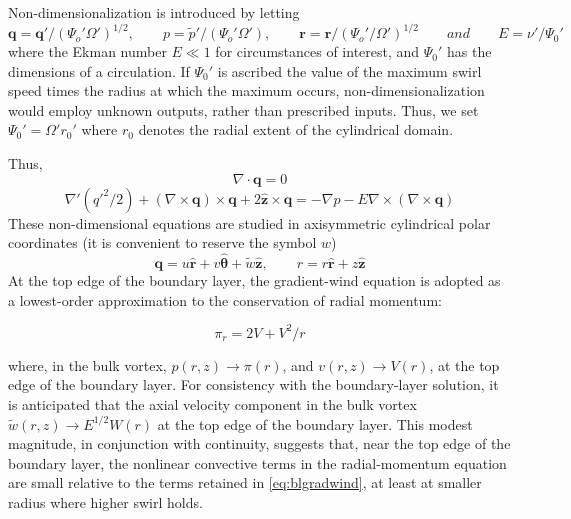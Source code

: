 \documentclass[preprint, prX]{revtex4}
\begin{document}
Non-dimensionalization is introduced by letting
\begin{equation}
\mathbf{q}=\mathbf{q'}/(\Psi_o' \Omega')^{1/2}, \qquad p=\tilde{p}' /(\Psi_o' \Omega'), \qquad \mathbf{r} = \mathbf{r}/(\Psi_o'/\Omega')^{1/2} \qquad and \qquad E = \nu' / \Psi_0'
\end{equation}
where the Ekman number $E \ll 1$ for circumstances of interest, and $\Psi_0'$ has the
dimensions of a circulation. If $\Psi_0'$ is ascribed the value of the maximum swirl speed times the radius at which the maximum occurs, non-dimensionalization would employ unknown outputs, rather than prescribed inputs. Thus, we set $\Psi_0' = \Omega' r_0'$ where $r_0$ denotes the radial extent of the cylindrical domain.

Thus,
\begin{equation}
\nabla \cdot \mathbf{q}=0
\label{eq:blcon}
\end{equation}
\begin{equation}
\nabla'(q'^2/2) +(\nabla \times \mathbf{q})\times \mathbf{q} + 2 \mathbf{\hat{z}} \times \mathbf{q}=-\nabla p - E \nabla \times (\nabla \times \mathbf{q})
\label{eq:blradmom}
\end{equation}
These non-dimensional equations are studied in axisymmetric cylindrical polar coordinates (it is convenient to reserve the symbol $w$)
\begin{equation}
\mathbf{q} = u \mathbf{\hat{r}} + v \mathbf{\hat{\theta}} +\tilde{w}\mathbf{\hat{z}}, \qquad r = r \mathbf{\hat{r}} + z \mathbf{\hat{z}}
\end{equation}
At the top edge of the boundary layer, the gradient-wind equation is adopted as a lowest-order approximation to the conservation of radial momentum:

\begin{equation}
\pi_r = 2 V + V^2 /r
\label{eq:blgradwind}
\end{equation}

where, in the bulk vortex, $p(r, z) \rightarrow \pi(r)$, and $v(r, z) \rightarrow V(r)$, at the top edge of the
boundary layer. For consistency with the boundary-layer solution, it is anticipated that the axial velocity component in the bulk vortex $\tilde{w}(r,z) \rightarrow E^{1/2} W(r)$ at the top edge of the boundary layer. This modest magnitude, in conjunction with continuity, suggests that, near the top edge of the boundary layer, the nonlinear convective terms in the radial-momentum equation are small relative to the terms retained in \eqref{eq:blgradwind}, at least at smaller radius where higher swirl holds.
\end{document}
